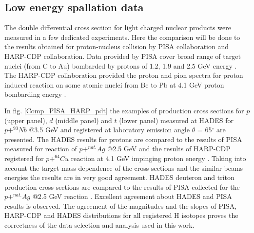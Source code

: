 \subsection{\label{spal_data} Low energy spallation data}

The double differential cross section for light charged nuclear products were measured in a few dedicated experiments. 
Here the comparison will be done to the results obtained for proton-nucleus collision by PISA collaboration 
and HARP-CDP collaboration. 
Data provided by PISA cover broad range of target nuclei (from C to Au) bombarded by protons of 1.2, 1.9 and 2.5 GeV energy \cite{bubak2007non,budzanowski2008competition,budzanowski2009variation,budzanowski2010comparison,fidelus2014sequential,fidelus2017non}. 
The HARP-CDP collaboration provided the proton and pion spectra for proton induced reaction on some atomic nuclei from Be to Pb 
at 4.1 GeV proton bombarding energy  \cite{HARP_CDP_Be1_2009,HARP_CDP_Be2_2009,HARP_CDP_Ta_2009,HARP_CDP_Cu_2009,HARP_CDP_C_2010,HARP_CDP_Sn_2011,HARP_CDP_Al_2012}.

In fig. \ref{Comp_PISA_HARP_pdt} the examples of production cross sections for 
$p$ (upper panel), $d$ (middle panel) and $t$ (lower panel) measured at HADES 
for $p+^{93}Nb$ @3.5 GeV and registered at laboratory emission angle $\theta$ = 65$^{\circ}$ are presented. 
The HADES results for protons are compared to the results of PISA measured for reaction 
of $p+^{nat.}Ag$ @2.5 GeV \cite{fidelus2017non} and the results of HARP-CDP 
registered for $p+^{64}Cu$ reaction at 4.1 GeV impinging proton energy \cite{HARP_CDP_Cu_2009}. 
Taking into account the target mass dependence of the cross sections 
and the similar beams energies the results are in very good agreement. 
HADES deuteron and triton production cross sections are compared to the results of PISA 
collected for the $p+^{nat.}Ag$ @2.5 GeV reaction \cite{fidelus2017non}. 
Excellent agreement about HADES and PISA results is observed. 
The agreement of the magnitudes and the slopes of PISA, HARP-CDP and HADES distributions 
for all registered H isotopes proves the correctness of the 
data selection and analysis used in this work. 


